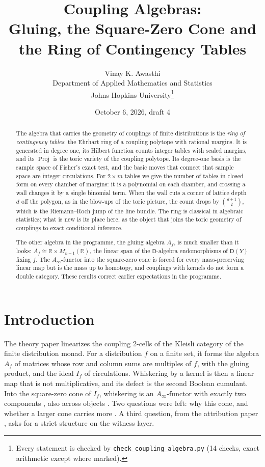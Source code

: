 \documentclass[11pt]{article}
\title{Coupling Algebras:\\
Gluing, the Square-Zero Cone and the Ring of Contingency Tables}
\author{Vinay K. Awasthi\\
Department of Applied Mathematics and Statistics\\
Johns Hopkins University\thanks{Every statement is checked by \texttt{check\_coupling\_algebra.py} (14 checks, exact
arithmetic except where marked).}}
\date{October 6, 2026, draft 4}
\theoremstyle{definition}
\theoremstyle{remark}
\newcommand{\D}{\mathsf{D}}
\newcommand{\R}{\mathbb{R}}
\begin{document}
\maketitle

\begin{abstract}
The algebra that carries the geometry of couplings of finite distributions is the \emph{ring of contingency tables}:
the Ehrhart ring of a coupling polytope with rational margins. It is generated in degree one, its Hilbert function counts
integer tables with scaled margins, and its $\operatorname{Proj}$ is the toric variety of the coupling polytope. Its degree-one
basis is the sample space of Fisher's exact test, and the basic moves that connect that sample space are integer
circulations. For $2\times m$ tables we give the number of tables in closed form on every chamber of margins: it is a
polynomial on each chamber, and crossing a wall changes it by a single binomial term. When the wall cuts a corner of
lattice depth $d$ off the polygon, as in the blow-ups of the toric picture, the count drops by $\binom{d+1}2$, which is the
Riemann--Roch jump of the line bundle. The ring is classical in algebraic statistics; what is new is its place here, as the
object that joins the toric geometry of couplings to exact conditional inference.

The other algebra in the programme, the gluing algebra $A_f$, is much smaller than it looks: $A_f\cong\R\times M_{n-1}(\R)$, the
linear span of the $\D$-algebra endomorphisms of $\D(Y)$ fixing $f$. The $A_\infty$-functor into the square-zero cone is forced
for every mass-preserving linear map but is the mass up to homotopy, and couplings with kernels do not form a double
category. These results correct earlier expectations in the programme.
\end{abstract}

\tableofcontents

\section{Introduction}\label{sec:intro}

The theory paper \cite{Conditionals} linearizes the coupling 2-cells of the Kleisli category of the finite distribution
monad. For a distribution $f$ on a finite set, it forms the algebra $A_f$ of matrices whose row and column sums are
multiples of $f$, with the gluing product, and the ideal $I_f$ of circulations. Whiskering by a kernel is then a linear
map that is not multiplicative, and its defect is the second Boolean cumulant. Into the square-zero cone of $I_f$,
whiskering is an $A_\infty$-functor with exactly two components \cite[Thm.~5.2]{Conditionals}, also across objects
\cite[Thm.~10.2]{Conditionals}. Two questions were left: why this cone, and whether a larger cone carries more
\cite[Question~9.4]{Conditionals}. A third question, from the attribution paper \cite[Open problem~5]{Attribution}, asks
for a strict structure on the witness layer.
\end{document}
